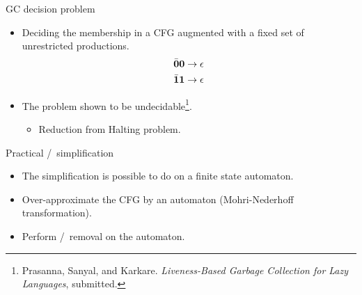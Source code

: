 \documentclass[xcolor=x11names,compress,mathserif]{beamer}
\renewcommand{\(}{\begin{columns}}
\renewcommand{\)}{\end{columns}}
\newcommand{\<}[1]{\begin{column}{#1}}
\renewcommand{\>}{\end{column}}
\begin{document}
\begin{frame}{GC decision problem}

\begin{itemize}
\item Deciding the
  membership in  a CFG augmented  with a
  fixed set of unrestricted productions.
  \begin{align*}
    \bar{\mathbf{0}}\mathbf{0}    \rightarrow    \epsilon\\
    \bar{\mathbf{1}}\mathbf{1}    \rightarrow   \epsilon\\
  \end{align*}
\item The problem shown to be undecidable\footnote{ Prasanna, Sanyal, and Karkare. {\em Liveness-Based Garbage Collection for Lazy Languages}, submitted.}.
  \begin{itemize}
  \item Reduction from Halting problem.
  \end{itemize}
\end{itemize}
\end{frame}
\begin{frame}{Practical \bcar/\bcdr\  simplification}

\begin{itemize}
\item The simplification is possible to do on a finite state automaton.
\item Over-approximate the CFG by an automaton
  (Mohri-Nederhoff transformation).
\item Perform \acar/\acdr\ removal on the automaton.
\end{itemize}

\end{frame}
\end{document}
